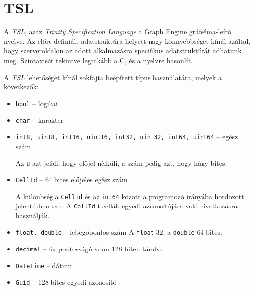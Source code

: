 \section{TSL}

A \emph{TSL}\cite{GraphEngineTSL}, azaz \emph{Trinity Specification Language} a Graph Engine gráfséma-leíró nyelve. Az előre definiált adatstruktúra helyett nagy könnyebbséget kínál azáltal, hogy szerveroldalon az adott alkalmazásra specifikus adatstruktúrát adhatunk meg. Szintaxisát tekintve leginkább a C, \cpp{}  és a \Csh{} nyelvre hasonlít.

A \emph{TSL} lehetőséget kínál sokfajta beépített típus használatára, melyek a következők:
\begin{itemize}
	\item \texttt{bool} \--- logikai
	\item \texttt{char} \--- karakter
	\item \texttt{int8, uint8, int16, uint16, int32, uint32, int64, uint64} \--- egész szám 
		
		Az \texttt{u} azt jelöli, hogy előjel nélküli, a szám pedig azt, hogy hány bites.
	\item \texttt{CellId} \--- 64 bites előjeles egész szám
		
		A különbség a \texttt{Cellid} és az \texttt{int64} között a programozó irányába hordozott jelentésben van. A \texttt{CellId}-t cellák egyedi azonosítójára való hivatkozásra használják.
	\item \texttt{float, double} \--- lebegőpontos szám
		A \texttt{float} 32, a \texttt{double} 64 bites.
	\item \texttt{decimal} \--- fix pontosságú szám 128 biten tárolva
	\item \texttt{DateTime} \--- dátum
	\item \texttt{Guid} \--- 128 bites egyedi azonosító
\end{itemize}

